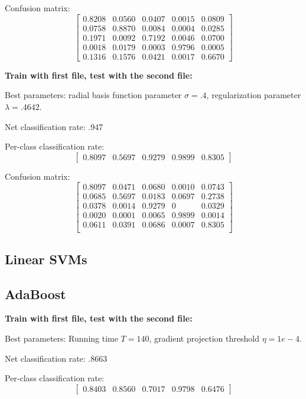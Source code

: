 \documentclass[letterpaper]{article}
\begin{document}
Confusion matrix:
$$\begin{bmatrix}
0.8208 &   0.0560  & 0.0407 &   0.0015  &  0.0809\\
    0.0758&    0.8870 &   0.0084&    0.0004 &   0.0285\\
    0.1971   & 0.0092   & 0.7192  &  0.0046   & 0.0700\\
    0.0018   & 0.0179    &0.0003  &  0.9796  &  0.0005\\
    0.1316   &0.1576    &0.0421  &  0.0017  &  0.6670
\end{bmatrix}$$

\textbf{Train with first file, test with the second file:}

Best parameters: radial basis function parameter $\sigma=.4$, regularization parameter $\lambda=.4642$.

Net classification rate: .947

Per-class classification rate: 
$$\begin{bmatrix}0.8097  &  0.5697   & 0.9279   & 0.9899  &  0.8305\end{bmatrix}$$

Confusion matrix:
$$\begin{bmatrix}
0.8097&    0.0471&    0.0680  &  0.0010  &  0.0743\\
    0.0685&    0.5697&    0.0183&    0.0697  &  0.2738\\
    0.0378   & 0.0014&    0.9279  &       0 &   0.0329\\
    0.0020 &   0.0001 &   0.0065 &   0.9899  &  0.0014\\
    0.0611   & 0.0391  &  0.0686  &  0.0007&    0.8305\\
\end{bmatrix}$$


\subsection*{Linear SVMs}

\subsection*{AdaBoost}

\textbf{Train with first file, test with the second file:}

Best parameters: Running time $T=140$, gradient projection threshold $\eta=1e-4$.

Net classification rate: .8663

Per-class classification rate: 
$$\begin{bmatrix} 0.8403  &  0.8560   & 0.7017 &   0.9798  &  0.6476\end{bmatrix}$$
\end{document}
